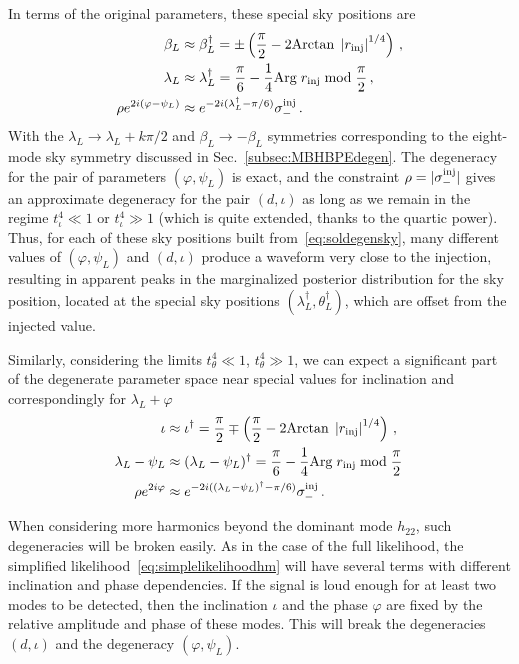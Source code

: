 \documentclass[aps,showpacs,twocolumn,prd,superscriptaddress,nofootinbib]{revtex4-1}
\newcommand{\bsub}{\begin{subequations}}
\newcommand{\esub}{\end{subequations}}
\newcommand\betaL{{\beta_{L}}}
\newcommand\lambdaL{{\lambda_{L}}}
\newcommand\psiL{{\psi_{L}}}
\begin{document}
In terms of the original parameters, these special sky positions are
\bsub\label{eq:soldegensky}
\begin{align}
  \betaL &\approx \beta_{L}^{\dagger} = \pm\left(\frac{\pi}{2} - 2 \mathrm{Arctan} \; \left| r_{\rm inj}\right|^{1/4} \right)\,, \\
  \lambdaL &\approx \lambda_{L}^{\dagger} =\frac{\pi}{6} -\frac{1}{4} \mathrm{Arg} \; r_{\rm inj} \;\mathrm{mod}\; \frac{\pi}{2} \,,\\
  \rho e^{2i(\varphi-\psiL)} &\approx e^{-2i(\lambda_{L}^{\dagger} - \pi/6)} \sigma_{-}^{\rm inj} \,.
\end{align}
\esub
With the $\lambdaL \rightarrow \lambdaL + k \pi/2$ and $\betaL \rightarrow - \betaL$ symmetries corresponding to the eight-mode sky symmetry discussed in Sec.~\ref{subsec:MBHBPEdegen}. The degeneracy for the pair of parameters $(\varphi, \psiL)$ is exact, and the constraint $\rho = |\sigma_{-}^{\rm inj}|$ gives an approximate degeneracy for the pair $(d, \iota)$ as long as we remain in the regime $t_{\iota}^{4} \ll 1$ or $t_{\iota}^{4} \gg 1$ (which is quite extended, thanks to the quartic power). Thus, for each of these sky positions built from~\eqref{eq:soldegensky}, many different values of $(\varphi, \psiL)$ and $(d, \iota)$ produce a waveform very close to the injection, resulting in apparent peaks in the marginalized posterior distribution for the sky position, located at the special sky positions $(\lambda_{L}^{\dagger}, \theta_{L}^{\dagger})$, which are offset from the injected value.

Similarly, considering the limits $t_{\theta}^{4} \ll 1$, $t_{\theta}^{4} \gg 1$, we can expect a significant part of the degenerate parameter space near special values for inclination and correspondingly for $\lambda_L+\varphi$
\bsub\label{eq:soldegeniotaphi}
\begin{align}
	\iota&\approx\iota^{\dagger} = \frac{\pi}{2} \mp \left(\frac{\pi}{2} - 2 \mathrm{Arctan} \; \left| r_{\rm inj}\right|^{1/4} \right) \,, \\
	\lambda_L-\psiL&\approx (\lambda_{L} - \psiL)^{\dagger} = \frac{\pi}{6} -\frac{1}{4} \mathrm{Arg} \; r_{\rm inj} \;\mathrm{mod}\; \frac{\pi}{2} \,\\
        \rho e^{2i\varphi} &\approx e^{-2i ((\lambda_{L} - \psi_{L})^{\dagger} - \pi/6)} \sigma_{-}^{\rm inj} \,.
\end{align}
\esub

When considering more harmonics beyond the dominant mode $h_{22}$, such degeneracies will be broken easily. As in the case of the full likelihood, the simplified likelihood~\eqref{eq:simplelikelihoodhm} will have several terms with different inclination and phase dependencies. If the signal is loud enough for at least two modes to be detected, then the inclination $\iota$ and the phase $\varphi$ are fixed by the relative amplitude and phase of these modes. This will break the degeneracies $(d, \iota)$ and the degeneracy $(\varphi, \psiL)$.
\end{document}
